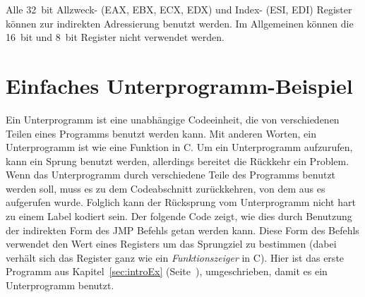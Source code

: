 Alle 32~bit Allzweck- (EAX, EBX, ECX, EDX) und Index- (ESI, EDI)
Register k\"{o}nnen zur indirekten Adressierung benutzt werden. Im
Allgemeinen k\"{o}nnen die 16~bit und 8~bit Register nicht verwendet
werden. 

\section{Einfaches Unterprogramm-Beispiel}

Ein Unterprogramm ist eine unabh\"{a}ngige Codeeinheit, die von
verschiedenen Teilen eines Programms benutzt werden kann. Mit
anderen Worten, ein Unterprogramm ist wie eine Funktion in C\@. Um
ein Unterprogramm aufzurufen, kann ein Sprung benutzt werden,
allerdings bereitet die R\"{u}ckkehr ein Problem. Wenn das Unterprogramm
durch verschiedene Teile des Programms benutzt werden soll, muss es
zu dem Codeabschnitt zur\"{u}ckkehren, von dem aus es aufgerufen wurde.
Folglich kann der R\"{u}cksprung vom Unterprogramm nicht hart zu einem
Label kodiert sein. Der folgende Code zeigt, wie dies durch
Benutzung der indirekten Form des {\code JMP} Befehls getan werden
kann. Diese Form des Befehls verwendet den Wert eines Registers um
das Sprungziel zu bestimmen (dabei verh\"{a}lt sich das Register ganz
wie ein \emph{Funktionszeiger}  in C). Hier
ist das erste Programm aus Kapitel~\ref{sec:introEx}
(Seite~\pageref{sec:introEx}), umgeschrieben, damit es ein
Unterprogramm benutzt.
